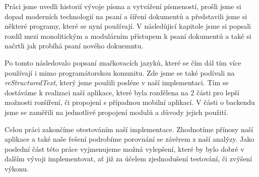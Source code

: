 Práci jsme uvedli historií vývoje písma a vytváření písmeností, prošli jsme si dopad moderních technologií na psaní a šíření dokumentů a představili jsme si
některé programy, které se nyní používají. V následůjicí kapitole jsme si popsali rozdíl mezi monolitickým a modulárním přístupem k psaní dokumentů a také si
načrtli jak probíhá psaní nového dokuemntu.

Po tomto následovalo popsaní značkovacích jazyků, které se čím dál tím více používají i mimo programátorskou komunitu. Zde jsme se také podívali na
\textit{reStructuredText}, který jsme použili posléze v naší implementaci. Tím se dostáváme k realizaci naší aplikace, které byla rozdělena na 2 části
pro lepší možnosti rozšíření, či propojení s případnou mobilní aplikací. V části o back\-endu jsme se zaměřili na jednotlivé propojení modulů a důvody jejich
použití.

Celou práci zakončíme otestováním naší implementace. Zhodnotíme příno\-sy naší aplikace a také naše řešení podrobíme porovnání se závěrem z naší analýzy. Jako poslední
část této práce vyjmenujeme možná vylepšení, které by bylo dobré v dalším vývoji implementovat, ať již za účelem zjednodušení testování, či zvýšení výkonu.